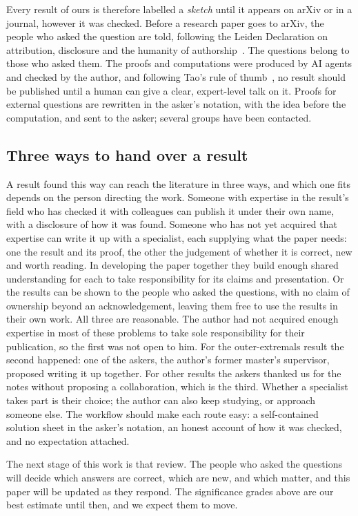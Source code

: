 \documentclass[11pt]{amsart}
\begin{document}
Every result of ours is therefore labelled a \emph{sketch} until it appears on
arXiv or in a journal, however it was checked. Before a research paper goes to
arXiv, the people who asked the question are told, following the Leiden
Declaration on attribution, disclosure and the humanity of
authorship~\cite{leiden}. The questions belong to those who asked them. The
proofs and computations were produced by AI agents and checked by the author,
and following Tao's rule of thumb~\cite{tao-age}, no result should be published
until a human can give a clear, expert-level talk on it. Proofs for external
questions are rewritten in the asker's notation, with the idea before the
computation, and sent to the asker; several groups have been contacted.

\subsection*{Three ways to hand over a result}
A result found this way can reach the literature in three ways, and which one
fits depends on the person directing the work. Someone with expertise in the
result's field who has checked it with colleagues can publish it under their
own name, with a disclosure of how it was found. Someone who has not yet
acquired that expertise can write it up with a specialist, each supplying what
the paper needs: one the result and its proof, the other the judgement of
whether it is correct, new and worth reading. In developing the paper together
they build enough shared understanding for each to take responsibility for its
claims and presentation. Or the results can be shown to the people who asked
the questions, with no claim of ownership beyond an acknowledgement, leaving
them free to use the results in their own work. All three are reasonable. The
author had not acquired enough expertise in most of these problems to take sole
responsibility for their publication, so the first was not open to him. For the
outer-extremals result the second happened: one of the askers, the author's
former master's supervisor, proposed writing it up together. For other results
the askers thanked us for the notes without proposing a collaboration, which is
the third. Whether a specialist takes part is their choice; the author can also
keep studying, or approach someone else. The workflow should make each route
easy: a self-contained solution sheet in the asker's notation, an honest
account of how it was checked, and no expectation attached.

The next stage of this work is that review. The people who asked the questions
will decide which answers are correct, which are new, and which matter, and
this paper will be updated as they respond. The significance grades above are
our best estimate until then, and we expect them to move.
\end{document}
